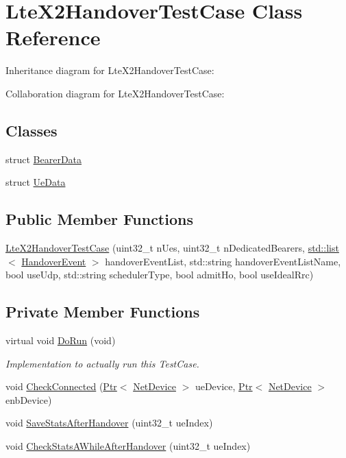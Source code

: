 \hypertarget{classLteX2HandoverTestCase}{}\section{Lte\+X2\+Handover\+Test\+Case Class Reference}
\label{classLteX2HandoverTestCase}


Inheritance diagram for Lte\+X2\+Handover\+Test\+Case\+:


Collaboration diagram for Lte\+X2\+Handover\+Test\+Case\+:
\subsection*{Classes}
\begin{DoxyCompactItemize}
\item 
struct \hyperlink{structLteX2HandoverTestCase_1_1BearerData}{Bearer\+Data}
\item 
struct \hyperlink{structLteX2HandoverTestCase_1_1UeData}{Ue\+Data}
\end{DoxyCompactItemize}
\subsection*{Public Member Functions}
\begin{DoxyCompactItemize}
\item 
\hyperlink{classLteX2HandoverTestCase_adfe01db2c8f4d0793ac1c8883cdfd5f4}{Lte\+X2\+Handover\+Test\+Case} (uint32\+\_\+t n\+Ues, uint32\+\_\+t n\+Dedicated\+Bearers, \hyperlink{openflow-interface_8h_afd9bcfa176617760671b67580f536fa7}{std\+::list}$<$ \hyperlink{structHandoverEvent}{Handover\+Event} $>$ handover\+Event\+List, std\+::string handover\+Event\+List\+Name, bool use\+Udp, std\+::string scheduler\+Type, bool admit\+Ho, bool use\+Ideal\+Rrc)
\end{DoxyCompactItemize}
\subsection*{Private Member Functions}
\begin{DoxyCompactItemize}
\item 
virtual void \hyperlink{classLteX2HandoverTestCase_a5d77d6fbe61da649203846d4617b4716}{Do\+Run} (void)
\begin{DoxyCompactList}\small\item\em Implementation to actually run this Test\+Case. \end{DoxyCompactList}\item 
void \hyperlink{classLteX2HandoverTestCase_a60447eff6ec472a1637e479638cc0f83}{Check\+Connected} (\hyperlink{classns3_1_1Ptr}{Ptr}$<$ \hyperlink{classns3_1_1NetDevice}{Net\+Device} $>$ ue\+Device, \hyperlink{classns3_1_1Ptr}{Ptr}$<$ \hyperlink{classns3_1_1NetDevice}{Net\+Device} $>$ enb\+Device)
\item 
void \hyperlink{classLteX2HandoverTestCase_abf950764cf8a00bff9999d30413812db}{Save\+Stats\+After\+Handover} (uint32\+\_\+t ue\+Index)
\item 
void \hyperlink{classLteX2HandoverTestCase_ad9f1588abf6c25b126b537839095b68a}{Check\+Stats\+A\+While\+After\+Handover} (uint32\+\_\+t ue\+Index)
\end{DoxyCompactItemize}
